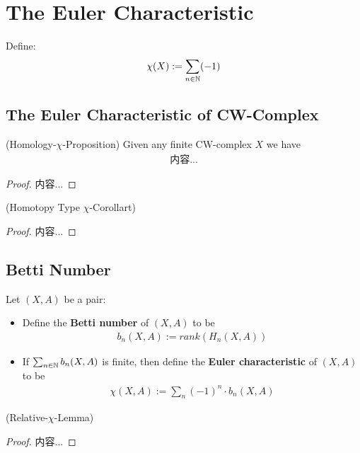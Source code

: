 \documentclass[Total.tex]{subfiles}
\begin{document}
		\section{The Euler Characteristic}
			\begin{Def}
				Define:
				\begin{gather*}
					\chi(X):=\sum_{n\in \mathbb{N}} (-1)
				\end{gather*}
			\end{Def}
			\subsection{The Euler Characteristic of CW-Complex}
				\begin{proposition}
					(Homology-$\chi$-Proposition) Given any finite CW-complex $X$ we have
					\begin{gather*}
						内容...
					\end{gather*}
				\end{proposition}
				\begin{proof}
					内容...
				\end{proof}
				
				\begin{corollary}
					(Homotopy Type $\chi$-Corollart)
				\end{corollary}
				\begin{proof}
					内容...
				\end{proof}
			\subsection{Betti Number}
				\begin{Def}
					Let $(X,A)$ be a pair:
					\begin{itemize}
						\item Define the \textbf{Betti number} of $(X,A)$ to be
						\begin{gather*}
							b_n(X,A):=rank(H_n(X,A))
						\end{gather*}
						\item If $\sum_{n\in \mathbb{N}} b_n(X,A)$ is finite, then define the \textbf{Euler characteristic} of $(X,A)$ to be
						\begin{gather*}
							\chi(X,A):=\sum_{n} (-1)^n\cdot b_n(X,A)
						\end{gather*}
					\end{itemize}
				\end{Def}
				
				\begin{lemma}
					(Relative-$\chi$-Lemma)
				\end{lemma}
				\begin{proof}
					内容...
				\end{proof}
\end{document}
